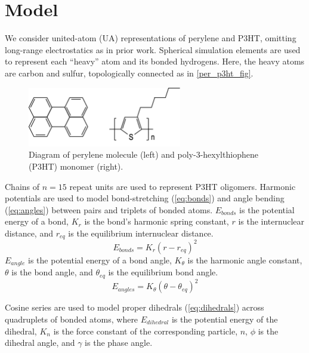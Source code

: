 
\section{Model}
We consider united-atom (UA) representations of perylene and P3HT, omitting long-range electrostatics as in prior work\cite{miller_enhanced_2017,miller_optimization_2018}.
Spherical simulation elements are used to represent each ``heavy'' atom and its bonded hydrogens.
Here, the heavy atoms are carbon and sulfur, topologically connected as in \autoref{per_p3ht_fig}.
\begin{figure}[hbt!]
    \centering
    \includegraphics[width=0.6\textwidth]{src/figures/FF_figs/P3HTandPerylene.png} %
    \caption{Diagram of perylene molecule (left) and poly-3-hexylthiophene (P3HT) monomer (right).}
    \label{per_p3ht_fig}
\end{figure}
Chains of $n=15$ repeat units are used to represent P3HT oligomers.
Harmonic potentials are used to model bond-stretching (\autoref{eq:bonds}) and angle bending (\autoref{eq:angles}) between pairs and triplets of bonded atoms. $E_{bonds}$ is the potential energy of a bond, $K_r$ is the bond's harmonic spring constant, $r$ is the internuclear distance, and $r_{eq}$ is the equilibrium internuclear distance. 
\begin{equation}
    E_{bonds} = K_r (r-r_{eq})^2
\label{eq:bonds}
\end{equation}
$E_{angle}$ is the potential energy of a bond angle, $K_{\theta}$ is the harmonic angle constant, $\theta$ is the bond angle, and $\theta_{eq}$ is the equilibrium bond angle. 
\begin{equation}
    E_{angles} = K_{\theta}(\theta-\theta_{eq})^2
\label{eq:angles}
\end{equation}

Cosine series are used to model proper dihedrals (\autoref{eq:dihedrals}) across quadruplets of bonded atoms, where $E_{dihedral}$ is the potential energy of the dihedral, $K_n$ is the force constant of the corresponding particle, $n$, $\phi$ is the dihedral angle, and $\gamma$ is the phase angle. 

